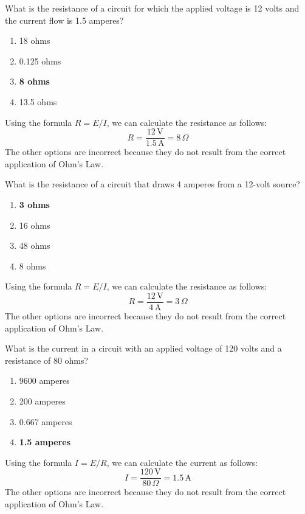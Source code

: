 
\begin{tcolorbox}[colback=gray!10!white,colframe=black!75!black,title={T5D05}]
    What is the resistance of a circuit for which the applied voltage is 12 volts and the current flow is 1.5 amperes?
    \begin{enumerate}[label=\Alph*),noitemsep]
        \item 18 ohms
        \item 0.125 ohms
        \item \textbf{8 ohms}
        \item 13.5 ohms
    \end{enumerate}
\end{tcolorbox}
Using the formula \(R = E / I\), we can calculate the resistance as follows:
\[
R = \frac{12\, \text{V}}{1.5\, \text{A}} = 8\, \Omega
\]
The other options are incorrect because they do not result from the correct application of Ohm's Law.


\begin{tcolorbox}[colback=gray!10!white,colframe=black!75!black,title={T5D06}]
    What is the resistance of a circuit that draws 4 amperes from a 12-volt source?
    \begin{enumerate}[label=\Alph*),noitemsep]
        \item \textbf{3 ohms}
        \item 16 ohms
        \item 48 ohms
        \item 8 ohms
    \end{enumerate}
\end{tcolorbox}
Using the formula \(R = E / I\), we can calculate the resistance as follows:
\[
R = \frac{12\, \text{V}}{4\, \text{A}} = 3\, \Omega
\]
The other options are incorrect because they do not result from the correct application of Ohm's Law.


\begin{tcolorbox}[colback=gray!10!white,colframe=black!75!black,title={T5D07}]
    What is the current in a circuit with an applied voltage of 120 volts and a resistance of 80 ohms?
    \begin{enumerate}[label=\Alph*),noitemsep]
        \item 9600 amperes
        \item 200 amperes
        \item 0.667 amperes
        \item \textbf{1.5 amperes}
    \end{enumerate}
\end{tcolorbox}
Using the formula \(I = E / R\), we can calculate the current as follows:
\[
I = \frac{120\, \text{V}}{80\, \Omega} = 1.5\, \text{A}
\]
The other options are incorrect because they do not result from the correct application of Ohm's Law.

